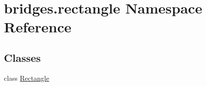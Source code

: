 \hypertarget{namespacebridges_1_1rectangle}{}\section{bridges.\+rectangle Namespace Reference}
\label{namespacebridges_1_1rectangle}
\subsection*{Classes}
\begin{DoxyCompactItemize}
\item 
class \mbox{\hyperlink{classbridges_1_1rectangle_1_1_rectangle}{Rectangle}}
\end{DoxyCompactItemize}
